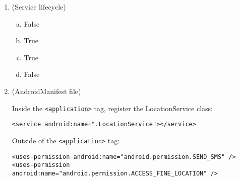 \documentclass[11pt]{article}
\begin{document}
\begin{enumerate}
\item (Service lifecycle)

\begin{enumerate}[a)]
\item False
\item True
\item True
\item False

\end{enumerate}

\item (AndroidManifest file)

Inside the \lstinline{<application>} tag, register the LocationService class:
\begin{lstlisting}
<service android:name=".LocationService"></service>
\end{lstlisting}

Outside of the \lstinline{<application>} tag:
\begin{lstlisting}
<uses-permission android:name="android.permission.SEND_SMS" />
<uses-permission android:name="android.permission.ACCESS_FINE_LOCATION" />
\end{lstlisting}

\end{enumerate}
\end{document}
